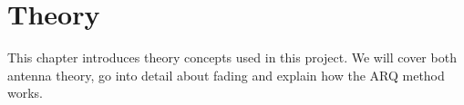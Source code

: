 \section{Theory}\label{ch:theory}

This chapter introduces theory concepts used in this project. We will cover both antenna theory, go into detail about fading and explain how the ARQ method works.









